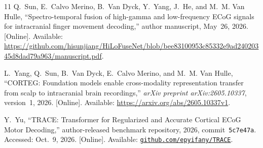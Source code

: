 \begin{thebibliography}{11}
Q.~Sun, E.~Calvo Merino, B.~Van Dyck, Y.~Yang, J.~He, and M.~M. Van Hulle, ``Spectro-temporal fusion of high-gamma and low-frequency ECoG signals for intracranial finger movement decoding,'' author manuscript, May~26, 2026. [Online]. Available: \url{https://github.com/hisunjiang/HiLoFuseNet/blob/bee83100953c85332e9ad24020345d8dad79a963/manuscript.pdf}.

L.~Yang, Q.~Sun, B.~Van Dyck, E.~Calvo Merino, and M.~M. Van Hulle, ``CORTEG: Foundation models enable cross-modality representation transfer from scalp to intracranial brain recordings,'' \emph{arXiv preprint arXiv:2605.10337}, version~1, 2026. [Online]. Available: \url{https://arxiv.org/abs/2605.10337v1}.

Y.~Yu, ``TRACE: Transformer for Regularized and Accurate Cortical ECoG Motor Decoding,'' author-released benchmark repository, 2026, commit~\texttt{5c7e47a}. Accessed: Oct.~9, 2026. [Online]. Available: \href{https://github.com/epyifany/TRACE/tree/5c7e47a469e266b472dfec82cf4adc379b25c23a}{\texttt{github.com/epyifany/TRACE}}.

\end{thebibliography}
